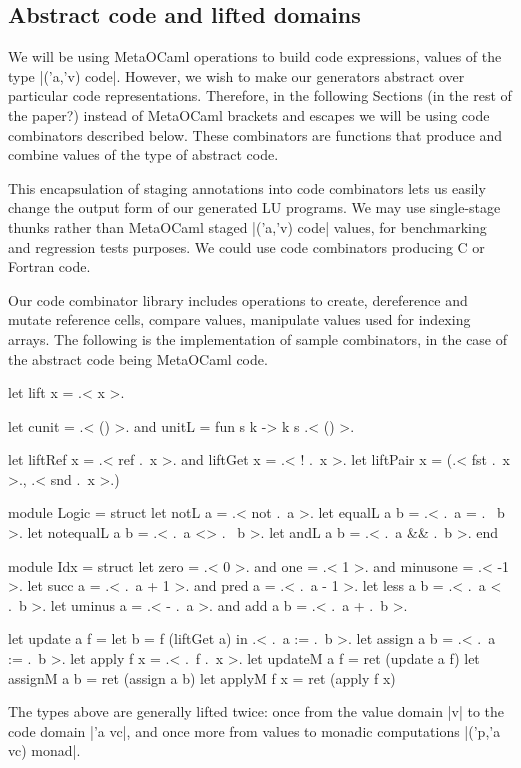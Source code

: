 \documentclass[draft]{elsart}
\begin{document}
\subsection{Abstract code and lifted domains}
We will be using MetaOCaml operations to build code expressions, values
of the type |('a,'v) code|. However, we wish to make our generators
abstract over particular code representations. Therefore, in the
following Sections (in the rest of the paper?) instead of
MetaOCaml brackets and escapes we will be using code combinators
described below. These combinators are functions that produce and
combine values of the type of abstract code. 

This encapsulation of staging annotations into code combinators lets
us easily change the output form of our generated LU programs. We may
use single-stage thunks rather than MetaOCaml staged |('a,'v) code|
values, for benchmarking and regression tests purposes. We could use
code combinators producing C or Fortran code.

Our code combinator library includes operations to create, dereference
and mutate reference cells, compare values, manipulate values used
for indexing arrays. The following is the implementation of sample
combinators, in the case of the abstract code being MetaOCaml code. 
\begin{code}
let lift x = .< x >.

let cunit = .< () >.  and unitL = fun s k -> k s .< () >.

let liftRef x = .< ref .~x >.  and   liftGet x = .< ! .~x >. 
let liftPair x = (.< fst .~x >., .< snd .~x >.)

module Logic = struct
  let notL a        = .< not .~a >.
  let equalL a b    = .< .~a = .~ b >.
  let notequalL a b = .< .~a <> .~ b >.
  let andL a b     = .< .~a && .~b >. 
end

module Idx = struct
  let zero = .< 0 >. and one = .< 1 >. and minusone = .< -1 >.
  let succ a = .< .~a + 1 >.  and  pred a = .< .~a - 1 >.
  let less a b = .< .~a < .~b >.
  let uminus a = .< - .~a >.  and  add a b = .< .~a + .~b >.

let update a f = let b = f (liftGet a) in .< .~a := .~b >.
let assign a b = .< .~a := .~b >.
let apply  f x = .< .~f .~x >.
let updateM a f = ret (update a f)
let assignM a b = ret (assign a b)
let applyM  f x = ret (apply f x)
\end{code}


\noindent  The types above are
generally lifted twice: once from the value domain |v| to the code
domain |'a vc|, and once more from values to monadic computations
|('p,'a vc) monad|. 
\end{document}
